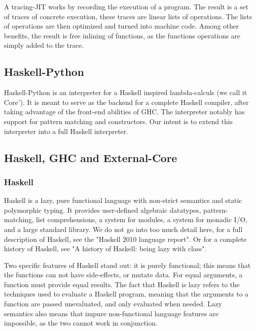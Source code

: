 A tracing-JIT works by recording the execution of a program. The result is a set of 
traces of concrete execution, these traces are linear lists of operations. The lists of
operations are then optimized and turned into machine code. Among other benefits, the
result is free inlining of functions, as the functions operations are simply added to
the trace. \cite{bolz2011runtime}

\subsection{Haskell-Python}

Haskell-Python is an interpreter for a Haskell inspired lambda-calculs (we call it Core'). 
It is meant to serve as the backend for a complete Haskell compiler, after taking advantage 
of the front-end abilities of GHC. The interpreter notably has support for pattern matching 
and constructors. Our intent is to extend this interpreter into a full Haskell interpreter.


\subsection{Haskell, GHC and External-Core}


\subsubsection{Haskell}

Haskell is a lazy, pure functional language with non-strict semantics and static 
polymorphic typing. It provides user-defined algebraic datatypes, pattern-matching, 
list comprehensions, a system for modules, a system for monadic I/O, and a large 
standard library. We do not go into too much detail here, for a full description 
of Haskell, see the "Haskell 2010 language report"\cite{marlow2010haskell}. 
Or for a complete history of Haskell, see "A history of Haskell: being lazy 
with class"\cite{hudak2007history}.

Two specific features
of Haskell stand out: it is purely functional; this means that the functions 
can not have side-effects, or mutate data. For equal arguments, a function 
must provide equal results. The fact that Haskell is lazy refers to the techniques
used to evaluate a Haskell program, meaning that the arguments to a function are passed
unevaluated, and only evaluated when needed. Lazy semantics also means that impure 
non-functional language features are impossible, as the two cannot work in conjunction.
\cite{marlow2010haskell, marlow2012glasgow}

